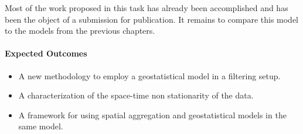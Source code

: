 Most of the work proposed in this task has already been accomplished and has
been the object of a submission for publication. It remains to compare this
model to the models from the previous chapters.

\paragraph{Expected Outcomes}

\begin{itemize}

\item A new methodology to employ a geostatistical model in a filtering setup.

\item A characterization of the space-time non stationarity of the data.

\item A framework for using spatial aggregation and geostatistical models in
the same model.

\end{itemize}
